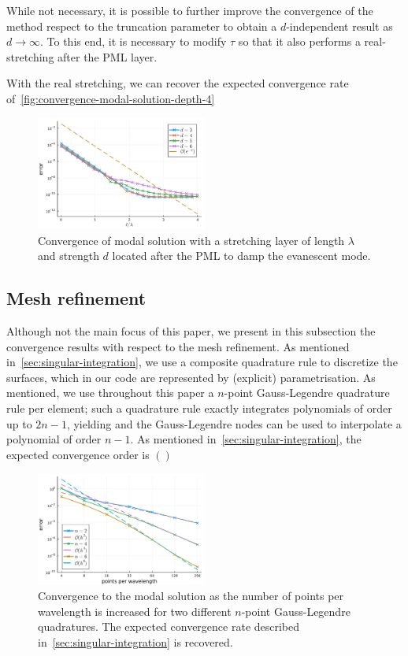 \documentclass[11pt]{article}
\begin{document}
While not necessary, it is possible to further improve the convergence of the
method respect to the truncation parameter to obtain a $d$-independent result as
$d \to \infty$. To this end, it is necessary to modify $\tau$ so that it also
performs a real-stretching after the PML layer. 

With the real stretching, we can recover the expected convergence rate
of~\cref{fig:convergence-modal-solution-depth-4}
\begin{figure}
  \centering
  \includegraphics[width=0.5\textwidth]{figures/convergence_pml_stretching_planewave_vary_depth.pdf}
  \caption{Convergence of modal solution with a stretching layer of length $\lambda$ and strength $d$ located after the PML to damp the evanescent mode. }
  \label{fig:pml-convergence-stretching-depth-4}
\end{figure}

\subsection{Mesh refinement}

Although not the main focus of this paper, we present in this subsection the
convergence results with respect to the mesh refinement. As mentioned
in~\cref{sec:singular-integration}, we use a composite quadrature rule to
discretize the surfaces, which in our code are represented by (explicit)
parametrisation. As mentioned, we use throughout this paper a $n$-point
Gauss-Legendre quadrature rule per element; such a quadrature rule exactly integrates
polynomials of order up to $2n-1$, yielding and the Gauss-Legendre nodes can be
used to interpolate a polynomial of order $n-1$. As mentioned
in~\cref{sec:singular-integration}, the expected convergence order is $()$


\begin{figure}
  \centering
  \includegraphics[width=0.5\textwidth]{figures/modal_convergence_meshsize_depth_1.pdf}
  \caption{Convergence to the modal solution as the number of points per
  wavelength is increased for two different $n$-point Gauss-Legendre
  quadratures. The expected convergence rate described
  in~\cref{sec:singular-integration} is recovered.}
  \label{fig:mesh-convergence}
\end{figure}
\end{document}
